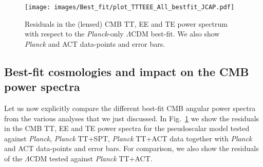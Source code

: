 \documentclass[a4paper,11pt]{article}
\begin{document}
 \begin{figure}[h!]
 \centering
   \texttt{[image: images/Best\_fit/plot\_TTTEEE\_All\_bestfit\_JCAP.pdf]}  
  \caption{Residuals in the (lensed) CMB TT, EE and TE power spectrum with respect to the \emph{Planck}-only $\Lambda$CDM best-fit. 
  We also show \emph{Planck} and ACT data-points and error bars.}
  \label{fig: Residual}
\end{figure}













\subsection{Best-fit cosmologies and impact on the CMB power spectra}\label{sec:bf_cosmo}


Let us now explicitly compare the different best-fit CMB angular power spectra from the various analyses that we just discussed.
In Fig.~\ref{fig: Residual} we show the residuals in the CMB TT, EE and TE power spectra for the pseudoscalar model tested against \emph{Planck}, \emph{Planck} TT+SPT, \emph{Planck} TT+ACT data together with \emph{Planck} and ACT data-points and error bars. For comparison, we also show the residuals of the $\Lambda$CDM tested against \emph{Planck} TT+ACT.
\end{document}
